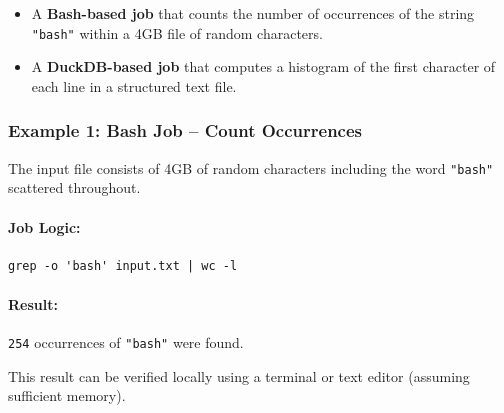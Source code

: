 \begin{itemize}
    \item A \textbf{Bash-based job} that counts the number of occurrences of the string \texttt{"bash"} within a 4GB file of random characters.
    \item A \textbf{DuckDB-based job} that computes a histogram of the first character of each line in a structured text file.
\end{itemize}

\subsubsection*{Example 1: Bash Job – Count Occurrences}

The input file consists of 4GB of random characters including the word \texttt{"bash"} scattered throughout.

\paragraph{Job Logic:}
\begin{verbatim}
grep -o 'bash' input.txt | wc -l
\end{verbatim}

\paragraph{Result:}  
\texttt{254} occurrences of \texttt{"bash"} were found.

This result can be verified locally using a terminal or text editor (assuming sufficient memory).

